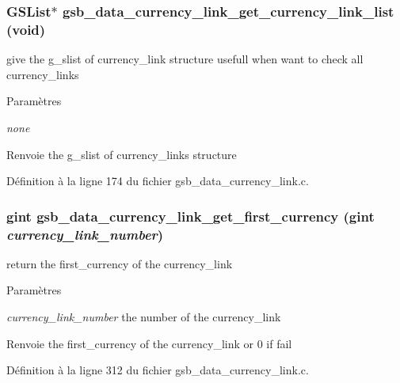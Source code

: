 \subsubsection[{gsb\_\-data\_\-currency\_\-link\_\-get\_\-currency\_\-link\_\-list}]{\setlength{\rightskip}{0pt plus 5cm}GSList$\ast$ gsb\_\-data\_\-currency\_\-link\_\-get\_\-currency\_\-link\_\-list (void)}\label{gsb__data__currency__link_8c_afabcb6dbde8dd4e991d69acf4c515ff6}
give the g\_\-slist of currency\_\-link structure usefull when want to check all currency\_\-links


\begin{DoxyParams}{Paramètres}
\item[{\em none}]\end{DoxyParams}
\begin{DoxyReturn}{Renvoie}
the g\_\-slist of currency\_\-links structure 
\end{DoxyReturn}


Définition à la ligne 174 du fichier gsb\_\-data\_\-currency\_\-link.c.

\subsubsection[{gsb\_\-data\_\-currency\_\-link\_\-get\_\-first\_\-currency}]{\setlength{\rightskip}{0pt plus 5cm}gint gsb\_\-data\_\-currency\_\-link\_\-get\_\-first\_\-currency (gint {\em currency\_\-link\_\-number})}\label{gsb__data__currency__link_8c_a2591e4c674d78df9749c4b3550102a9c}
return the first\_\-currency of the currency\_\-link


\begin{DoxyParams}{Paramètres}
\item[{\em currency\_\-link\_\-number}]the number of the currency\_\-link\end{DoxyParams}
\begin{DoxyReturn}{Renvoie}
the first\_\-currency of the currency\_\-link or 0 if fail 
\end{DoxyReturn}


Définition à la ligne 312 du fichier gsb\_\-data\_\-currency\_\-link.c.

